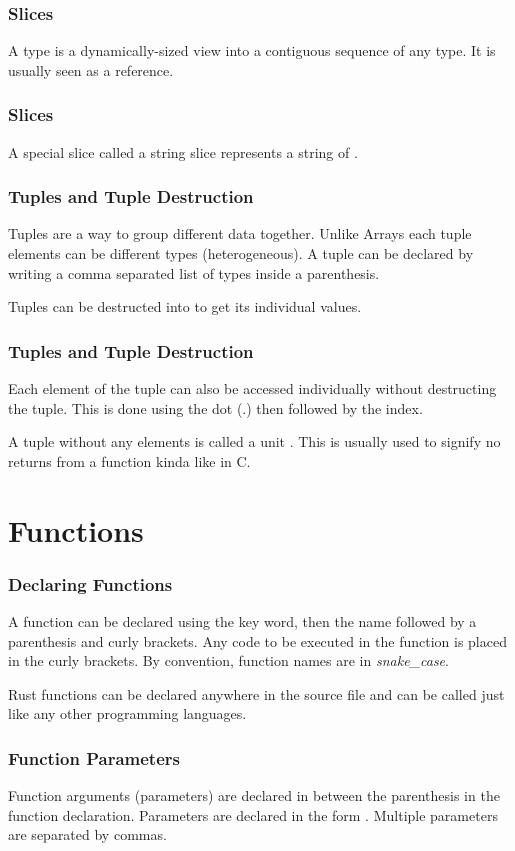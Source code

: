 \documentclass{beamer}
\begin{document}
\begin{frame}
  \frametitle{Slices}
  A  type is a dynamically-sized view into a contiguous sequence of any type. It is usually seen as a reference.
  
\end{frame}

\begin{frame}
  \frametitle{Slices}
  A special slice called a string slice  represents a string of .
  
\end{frame}

\begin{frame}
  \frametitle{Tuples and Tuple Destruction}
  Tuples are a way to group different data together. Unlike Arrays each tuple elements can be different types (heterogeneous). A tuple can be declared by writing a comma separated list of types inside a parenthesis.
  
  Tuples can be destructed into to get its individual values.
  
\end{frame}

\begin{frame}
  \frametitle{Tuples and Tuple Destruction}
  Each element of the tuple can also be accessed individually without destructing the tuple. This is done using the dot (.) then followed by the index.
  
  A tuple without any elements is called a unit \inlinecode{()}. This is usually used to signify no returns from a function kinda like  in C.
\end{frame}

\section{Functions}
\begin{frame}
  \frametitle{Declaring Functions}
  A function can be declared using the  key word, then the name followed by a parenthesis and curly brackets. Any code to be executed in the function is placed in the curly brackets. By convention, function names are in \emph{snake\_case}.
  
  Rust functions can be declared anywhere in the source file and can be called just like any other programming languages.
\end{frame}

\begin{frame}
  \frametitle{Function Parameters}
  Function arguments (parameters) are declared in between the parenthesis in the function declaration. Parameters are declared in the form . Multiple parameters are separated by commas.
  
\end{frame}
\end{document}
